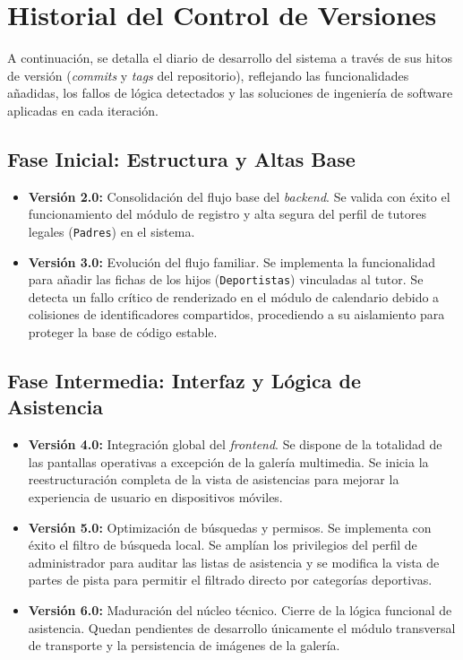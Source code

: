     \section{Historial del Control de Versiones}
    A continuación, se detalla el diario de desarrollo del sistema a través de sus hitos de versión (\textit{commits} y \textit{tags} del repositorio), reflejando las funcionalidades añadidas, los fallos de lógica detectados y las soluciones de ingeniería de software aplicadas en cada iteración.

    \subsection{Fase Inicial: Estructura y Altas Base}
    \begin{itemize}
        \item \textbf{Versión 2.0:} Consolidación del flujo base del \textit{backend}. Se valida con éxito el funcionamiento del módulo de registro y alta segura del perfil de tutores legales (\texttt{Padres}) en el sistema.
        \item \textbf{Versión 3.0:} Evolución del flujo familiar. Se implementa la funcionalidad para añadir las fichas de los hijos (\texttt{Deportistas}) vinculadas al tutor. Se detecta un fallo crítico de renderizado en el módulo de calendario debido a colisiones de identificadores compartidos, procediendo a su aislamiento para proteger la base de código estable.
    \end{itemize}

    \subsection{Fase Intermedia: Interfaz y Lógica de Asistencia}
    \begin{itemize}
        \item \textbf{Versión 4.0:} Integración global del \textit{frontend}. Se dispone de la totalidad de las pantallas operativas a excepción de la galería multimedia. Se inicia la reestructuración completa de la vista de asistencias para mejorar la experiencia de usuario en dispositivos móviles.
        \item \textbf{Versión 5.0:} Optimización de búsquedas y permisos. Se implementa con éxito el filtro de búsqueda local. Se amplían los privilegios del perfil de administrador para auditar las listas de asistencia y se modifica la vista de partes de pista para permitir el filtrado directo por categorías deportivas.
        \item \textbf{Versión 6.0:} Maduración del núcleo técnico. Cierre de la lógica funcional de asistencia. Quedan pendientes de desarrollo únicamente el módulo transversal de transporte y la persistencia de imágenes de la galería.
    \end{itemize}

